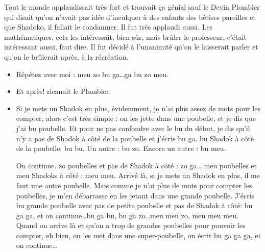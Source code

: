 \documentclass[11pt,a4paper]{article}
\begin{document}
Tout le monde applaudissait très fort et trouvait ça génial sauf le Devin Plombier 
qui disait qu'on n'avait pas idée d'inculquer à des enfants des bêtises pareilles 
et que Shadoko, il fallait le condamner. 
Il fut très applaudi aussi. Les mathématiques, 
cela les intéressait, bien sûr, mais brûler le professeur, c'était intéressant aussi, faut dire. 
Il fut décidé à l'unanimité qu'on le laisserait parler et qu'on le brûlerait après, à la récréation.
\begin{itemize}
\item Répétez avec moi : {\sc meu} {\sc zo} {\sc bu} {\sc ga}\ldots {\sc ga} {\sc bu} {\sc zo} {\sc meu}.
\item Et après! ricanait le Plombier.
\item Si je mets un Shadok en plus, évidemment, je n'ai plus assez 
de mots pour les compter, alors c'est très simple : on les jette dans une poubelle, 
et je dis que j'ai {\sc bu} poubelle. Et pour ne pas confondre avec le {\sc bu} du début, 
je dis qu'il n'y a pas de Shadok à côté de la poubelle et j'écris {\sc bu} {\sc ga}. 
{\sc bu} Shadok à côté de la poubelle: {\sc bu} {\sc bu}. Un autre : {\sc bu} {\sc zo}. 
Encore un autre : {\sc bu} {\sc meu}. 

On continue. {\sc zo} poubelles et pas de Shadok à côté : {\sc zo} {\sc ga}\ldots 
{\sc meu} poubelles et {\sc meu} Shadoks à côté : {\sc meu} {\sc meu}. 
Arrivé là, si je mets un Shadok en plus, il me faut une autre poubelle. 
Mais comme je n'ai plus de mots pour compter les poubelles, je m'en débarrasse 
en les jetant dans une grande poubelle. 
J'écris {\sc bu} grande poubelle avec pas de petite poubelle 
et pas de Shadok à côté: {\sc bu} {\sc ga} {\sc ga}, et on continue\ldots {\sc bu} {\sc ga} {\sc bu}, 
{\sc bu} {\sc ga} {\sc zo}\ldots {\sc meu} {\sc meu} {\sc zo}, {\sc meu} {\sc meu} {\sc meu}.
Quand on arrive là et qu'on a trop de grandes poubelles pour pouvoir les compter, 
eh bien, on les met dans une super-poubelle, on écrit {\sc bu} {\sc ga} {\sc ga} {\sc ga}, 
et on continue\ldots
\end{itemize}
\end{document}
